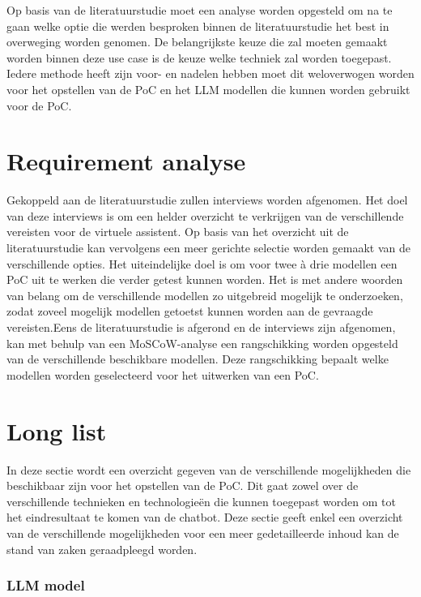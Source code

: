Op basis van de literatuurstudie moet een analyse worden opgesteld om na te gaan welke optie die werden besproken binnen de literatuurstudie het best in overweging worden genomen. De belangrijkste keuze die zal moeten gemaakt worden binnen deze use case is de keuze welke techniek zal worden toegepast. Iedere methode heeft zijn voor- en nadelen hebben moet dit weloverwogen worden voor het opstellen van de PoC en het LLM modellen die kunnen worden gebruikt voor de PoC.


\section{Requirement analyse}


Gekoppeld aan de literatuurstudie zullen interviews worden afgenomen. Het doel van deze interviews is om een helder overzicht te verkrijgen van de verschillende vereisten voor de virtuele assistent. Op basis van het overzicht uit de literatuurstudie kan vervolgens een meer gerichte selectie worden gemaakt van de verschillende opties. Het uiteindelijke doel is om voor twee à drie modellen een PoC uit te werken die verder getest kunnen worden. Het is met andere woorden van belang om de verschillende modellen zo uitgebreid mogelijk te onderzoeken, zodat zoveel mogelijk modellen getoetst kunnen worden aan de gevraagde vereisten.Eens de literatuurstudie is afgerond en de interviews zijn afgenomen, kan met behulp van een MoSCoW-analyse een rangschikking worden opgesteld van de verschillende beschikbare modellen. Deze rangschikking bepaalt welke modellen worden geselecteerd voor het uitwerken van een PoC.

\section{Long list}

In deze sectie wordt een overzicht gegeven van de verschillende mogelijkheden die beschikbaar zijn voor het opstellen van de PoC. Dit gaat zowel over de verschillende technieken en technologieën die kunnen toegepast worden om tot het eindresultaat te komen van de chatbot. Deze sectie geeft enkel een overzicht van de verschillende mogelijkheden voor een meer gedetailleerde inhoud kan de stand van zaken geraadpleegd worden.

\subsubsection{LLM model}

